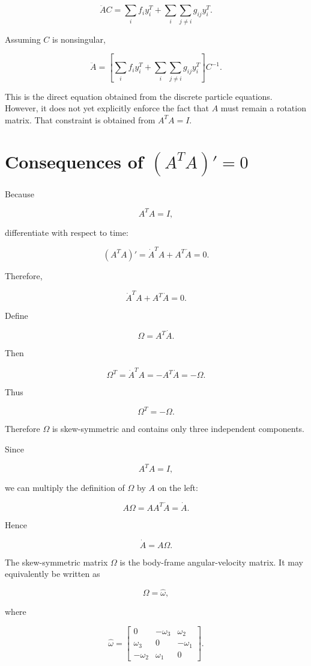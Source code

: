 \documentclass{article}
\begin{document}
\[
\ddot A C = \sum_i f_i y_i^T + \sum_i\sum_{j\ne i}g_{ij}y_i^T.
\]

Assuming \(C\) is nonsingular,

\[
\ddot A = \left[ \sum_i f_i y_i^T + \sum_i\sum_{j\ne i}g_{ij}y_i^T \right]C^{-1}.
\]

This is the direct equation obtained from the discrete particle equations. However, it does not yet explicitly enforce the fact that \(A\) must remain a rotation matrix. That constraint is obtained from \(A^T A=I\).

\section{Consequences of \((A^T A)'=0\)}

Because

\[
A^T A=I,
\]

differentiate with respect to time:

\[
\left(A^T A\right)' = \dot A^T A+A^T\dot A = 0.
\]

Therefore,

\[
\dot A^T A+A^T\dot A=0.
\]

Define

\[
\Omega=A^T\dot A.
\]

Then

\[
\Omega^T = \dot A^T A = -A^T\dot A = -\Omega.
\]

Thus

\[
\Omega^T=-\Omega.
\]

Therefore \(\Omega\) is skew-symmetric and contains only three independent components.

Since

\[
A^TA=I,
\]

we can multiply the definition of \(\Omega\) by \(A\) on the left:

\[
A\Omega = AA^T\dot A = \dot A.
\]

Hence

\[
\dot A=A\Omega.
\]

The skew-symmetric matrix \(\Omega\) is the body-frame angular-velocity matrix. It may equivalently be written as

\[
\Omega=\widehat{\omega},
\]

where

\[
\widehat{\omega} = \begin{bmatrix} 0&-\omega_3&\omega_2\\ \omega_3&0&-\omega_1\\ -\omega_2&\omega_1&0 \end{bmatrix}.
\]
\end{document}
